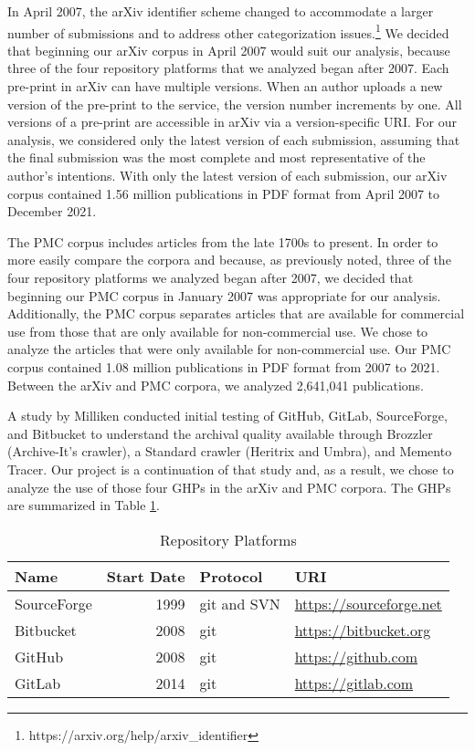 In April 2007, the arXiv identifier scheme changed to accommodate a larger number of submissions and to address other categorization issues.\footnote{https://arxiv.org/help/arxiv\_identifier} We decided that beginning our arXiv corpus in April 2007 would suit our analysis, because three of the four repository platforms that we analyzed began after 2007. Each pre-print in arXiv can have multiple versions. When an author uploads a new version of the pre-print to the service, the version number increments by one. All versions of a pre-print are accessible in arXiv via a version-specific URI. For our analysis, we considered only the latest version of each submission, assuming that the final submission was the most complete and most representative of the author's intentions. With only the latest version of each submission, our arXiv corpus contained 1.56 million publications in PDF format from April 2007 to December 2021. 

The PMC corpus includes articles from the late 1700s to present. In order to more easily compare the corpora and because, as previously noted, three of the four repository platforms we analyzed began after 2007, we decided that beginning our PMC corpus in January 2007 was appropriate for our analysis. Additionally, the PMC corpus  separates articles that are available for commercial use from those that are only available for non-commercial use. We chose to analyze the articles that were only available for non-commercial use. Our PMC corpus contained 1.08 million publications in PDF format from 2007 to 2021. Between the arXiv and PMC corpora, we analyzed 2,641,041 publications. 

A study by Milliken \cite{iasge_enviro_scan} conducted initial testing of GitHub, GitLab, SourceForge, and Bitbucket to understand the archival quality available through Brozzler (Archive-It's crawler), a Standard crawler (Heritrix and Umbra), and Memento Tracer. Our project is a continuation of that study and, as a result, we chose to analyze the use of those four GHPs in the arXiv and PMC corpora. The GHPs are summarized in Table \ref{tab:repos}.

\begin{table}
  \centering
  \begin{tabular}{|l|r|l|l|}
    \hline
    Name & Start Date & Protocol & URI\\
    \hline
    SourceForge & 1999 & git and SVN & \url{https://sourceforge.net}\\
    Bitbucket & 2008 & git & \url{https://bitbucket.org}\\
    GitHub & 2008 & git & \url{https://github.com}\\
    GitLab & 2014 & git & \url{https://gitlab.com}\\
  \hline
\end{tabular}
\caption{Repository Platforms}
\label{tab:repos}
\end{table}

